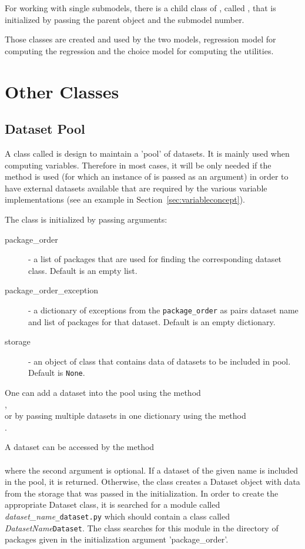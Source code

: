 {For working with single submodels, there is a child class of
, \coefficientsindex called
, \coefficientsindex that is initialized by passing the
parent object and the submodel number.

Those classes are created and used by the two  models, regression model
for computing the regression and the choice model for computing the utilities.

\section{Other Classes}
%
\subsection{Dataset Pool}
\label{sec:core-dataset-pool}
%
A class called  is design to maintain a 'pool' of datasets. It is mainly used when
computing variables. Therefore in most cases, it will be only needed if the  method
 is used (for which an instance of  is passed as an argument) in order
to have external datasets available that are required by the various variable implementations
 (see an example in Section~\ref{sec:variableconcept}).

The class is initialized by passing arguments:
\begin{description}
\item[package_order] - a list of packages that are used for finding the corresponding dataset class. Default is an empty list.
\item[package_order_exception] - a dictionary of exceptions from the \verb|package_order| as pairs dataset name
and list of packages for that dataset. Default is an empty dictionary.
\item[storage] - an object of class  that contains data of datasets to be included in pool. Default is \verb|None|.
\end{description}
One can add a dataset into the pool using the method \\
, \\
or by
passing multiple datasets in one dictionary using the method \\
.

A dataset can be accessed by the method \\
\\
 where the second argument is optional.
If a dataset of the given name is included in the pool, it is returned. Otherwise, the class creates a Dataset object with
data from the storage that was passed in the initialization. In order to create the appropriate Dataset class, it is searched
for a module called {\em dataset_name}\verb|_dataset.py| which should contain a class called {\em DatasetName}\verb|Dataset|.
The  class searches for this module in the directory  of packages given in the initialization argument
'package_order'.

}
